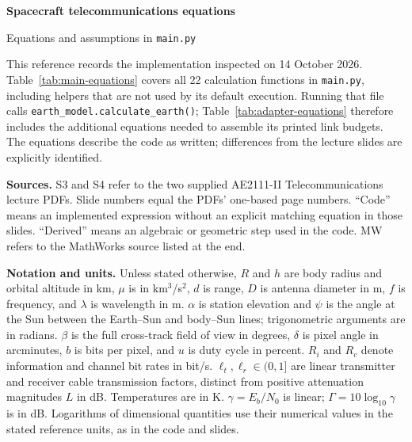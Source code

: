\documentclass[10pt,a4paper]{article}
\newcommand{\code}[1]{\nolinkurl{#1}}
\begin{document}
{\LARGE\bfseries Spacecraft telecommunications equations}\par
{\large Equations and assumptions in \code{main.py}}\par
\smallskip

This reference records the implementation inspected on 14 October 2026.
Table~\ref{tab:main-equations} covers all 22 calculation functions in
\code{main.py}, including helpers that are not used by its default execution.
Running that file calls \code{earth_model.calculate_earth()};
Table~\ref{tab:adapter-equations} therefore includes the additional equations
needed to assemble its printed link budgets. The equations describe the code
as written; differences from the lecture slides are explicitly identified.

\textbf{Sources.} S3 and S4 refer to the two supplied AE2111-II
Telecommunications lecture PDFs. Slide numbers equal the PDFs' one-based page
numbers. ``Code'' means an implemented expression without an explicit matching
equation in those slides. ``Derived'' means an algebraic or geometric step
used in the code. MW refers to the MathWorks source listed at the end.

\textbf{Notation and units.} Unless stated otherwise, $R$ and $h$ are body
radius and orbital altitude in km, $\mu$ is in km$^3$/s$^2$, $d$ is range,
$D$ is antenna diameter in m, $f$ is frequency, and $\lambda$ is wavelength in m.
$\alpha$ is station elevation and $\psi$ is the angle at the Sun between the
Earth--Sun and body--Sun lines; trigonometric arguments are in radians.
$\beta$ is the full cross-track field of view in degrees, $\delta$ is pixel
angle in arcminutes, $b$ is bits per pixel, and $u$ is duty cycle in percent.
$R_i$ and $R_c$ denote information and channel bit rates in bit/s.
$\ell_t,\ell_r\in(0,1]$ are linear transmitter and receiver cable transmission
factors, distinct from positive attenuation magnitudes $L$ in dB.
Temperatures are in K. $\gamma=E_b/N_0$ is linear; $\Gamma=10\log_{10}\gamma$
is in dB. Logarithms of dimensional quantities use their numerical values in
the stated reference units, as in the code and slides.
\end{document}
